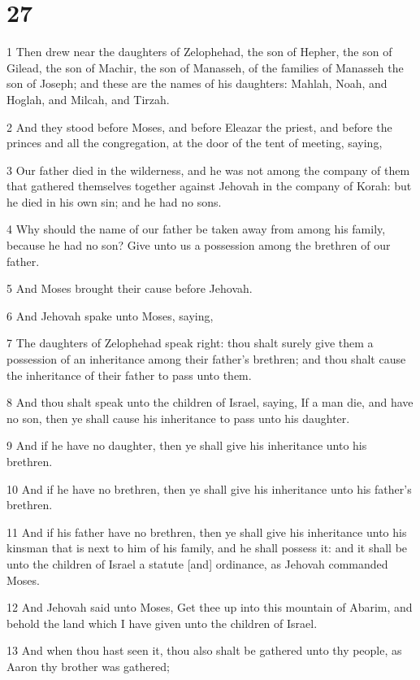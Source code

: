 \chapter{27}

\par 1 Then drew near the daughters of Zelophehad, the son of Hepher, the son of Gilead, the son of Machir, the son of Manasseh, of the families of Manasseh the son of Joseph; and these are the names of his daughters: Mahlah, Noah, and Hoglah, and Milcah, and Tirzah.
\par 2 And they stood before Moses, and before Eleazar the priest, and before the princes and all the congregation, at the door of the tent of meeting, saying,
\par 3 Our father died in the wilderness, and he was not among the company of them that gathered themselves together against Jehovah in the company of Korah: but he died in his own sin; and he had no sons.
\par 4 Why should the name of our father be taken away from among his family, because he had no son? Give unto us a possession among the brethren of our father.
\par 5 And Moses brought their cause before Jehovah.
\par 6 And Jehovah spake unto Moses, saying,
\par 7 The daughters of Zelophehad speak right: thou shalt surely give them a possession of an inheritance among their father's brethren; and thou shalt cause the inheritance of their father to pass unto them.
\par 8 And thou shalt speak unto the children of Israel, saying, If a man die, and have no son, then ye shall cause his inheritance to pass unto his daughter.
\par 9 And if he have no daughter, then ye shall give his inheritance unto his brethren.
\par 10 And if he have no brethren, then ye shall give his inheritance unto his father's brethren.
\par 11 And if his father have no brethren, then ye shall give his inheritance unto his kinsman that is next to him of his family, and he shall possess it: and it shall be unto the children of Israel a statute [and] ordinance, as Jehovah commanded Moses.
\par 12 And Jehovah said unto Moses, Get thee up into this mountain of Abarim, and behold the land which I have given unto the children of Israel.
\par 13 And when thou hast seen it, thou also shalt be gathered unto thy people, as Aaron thy brother was gathered;
